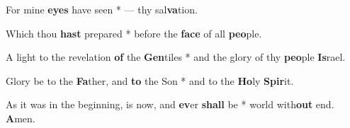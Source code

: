 \begin{multicols}{2}
	For mine \textbf{eyes} have seen * --- thy sal\textbf{va}tion.
	
	Which thou \textbf{hast} prepared * before the \textbf{face} of all \textbf{peo}ple.
	
	A light to the revelation \textbf{of} the \textbf{Gen}tiles * and the glory of thy \textbf{peo}ple \textbf{Is}rael.
	
	Glory be to the \textbf{Fa}ther, and \textbf{to} the Son * and to the \textbf{Ho}ly \textbf{Spir}it.
	
	As it was in the beginning, is now, and \textbf{ev}er \textbf{shall} be * world with\textbf{out} end. \textbf{A}men.
\end{multicols}